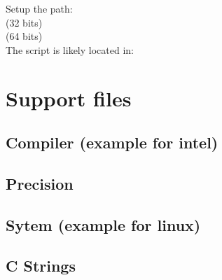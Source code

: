 \documentclass{article}
\begin{document}
Setup the path:\\
 (32 bits) \\
 (64 bits) \\
The script is likely located in:\\


\section{Support files}
\subsection{Compiler (example for intel)}
\label{fil:compiler}



\subsection{Precision}
\label{fil:precision}


\subsection{Sytem (example for linux)}
\label{fil:system}


\subsection{C Strings}
\label{fil:cstrings}
\end{document}
